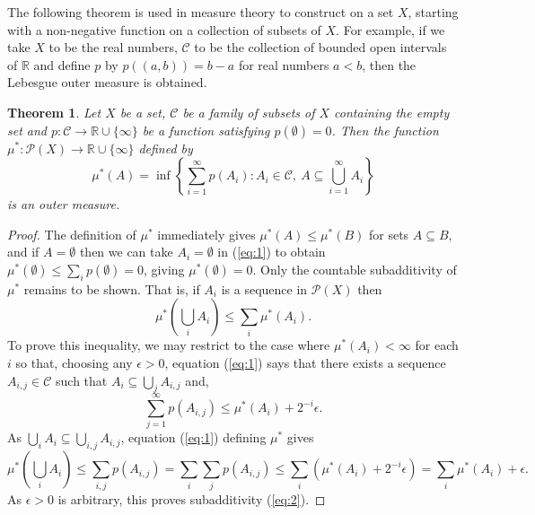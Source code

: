 \documentclass[12pt]{article}
\newtheorem*{theorem}{Theorem}
\begin{document}
The following theorem is used in measure theory to construct  on a set $X$, starting with a non-negative function on a collection of subsets of $X$. For example, if we take $X$ to be the real numbers, $\mathcal{C}$ to be the collection of bounded open intervals of $\mathbb{R}$ and define $p$ by $p((a,b))=b-a$ for real numbers $a<b$, then the Lebesgue outer measure is obtained.

\begin{theorem}
Let $X$ be a set, $\mathcal{C}$ be a family of subsets of $X$ containing the empty set and $p\colon\mathcal{C}\rightarrow \mathbb{R}\cup\{\infty\}$ be a function satisfying $p(\emptyset)=0$.
Then the function $\mu^*\colon\mathcal{P}(X)\rightarrow\mathbb{R}\cup\{\infty\}$ defined by
\begin{equation}\label{eq:1}
\mu^*(A)=\inf\left\{\sum_{i=1}^\infty p(A_i): A_i\in\mathcal{C},\ A\subseteq\bigcup_{i=1}^\infty A_i\right\}
\end{equation}
is an outer measure.
\end{theorem}
\begin{proof}
The definition of $\mu^*$ immediately gives $\mu^*(A)\le\mu^*(B)$ for sets $A\subseteq B$, and if $A=\emptyset$ then we can take $A_i=\emptyset$ in (\ref{eq:1}) to obtain $\mu^*(\emptyset)\le\sum_ip(\emptyset)=0$, giving $\mu^*(\emptyset)=0$. Only the countable subadditivity of $\mu^*$ remains to be shown.
That is, if $A_i$ is a sequence in $\mathcal{P}(X)$ then
\begin{equation}\label{eq:2}
\mu^*\left(\bigcup_i A_i\right)\le\sum_i\mu^*(A_i).
\end{equation}
To prove this inequality, we may restrict to the case where $\mu^*(A_i)<\infty$ for each $i$ so that, choosing any $\epsilon>0$, equation (\ref{eq:1}) says that there exists a sequence $A_{i,j}\in \mathcal{C}$ such that $A_i\subseteq\bigcup_j A_{i,j}$ and,
\begin{equation*}
\sum_{j=1}^\infty p(A_{i,j})\le\mu^*(A_i)+2^{-i}\epsilon.
\end{equation*}
As $\bigcup_iA_i\subseteq\bigcup_{i,j}A_{i,j}$, equation (\ref{eq:1}) defining $\mu^*$ gives
\begin{equation*}
\mu^*\left(\bigcup_iA_i\right)\le\sum_{i,j}p(A_{i,j})=\sum_i\sum_jp(A_{i,j})\le\sum_i(\mu^*(A_i)+2^{-i}\epsilon)=\sum_i\mu^*(A_i)+\epsilon.
\end{equation*}
As $\epsilon>0$ is arbitrary, this proves subadditivity (\ref{eq:2}).
\end{proof}
\end{document}
